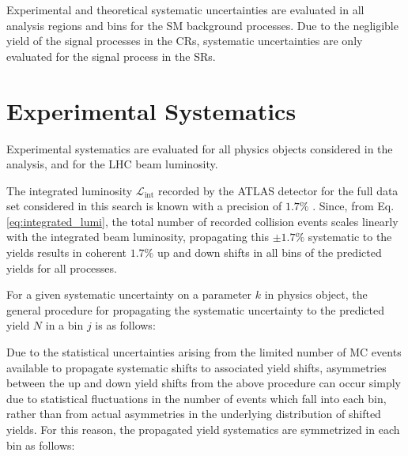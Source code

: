 Experimental and theoretical systematic uncertainties are evaluated in all analysis regions and bins for the SM background processes. Due to the negligible yield of the signal processes in the CRs, systematic uncertainties are only evaluated for the signal process in the SRs.

\section{Experimental Systematics}

Experimental systematics are evaluated for all physics objects considered in the analysis, and for the LHC beam luminosity. 

The integrated luminosity \(\mathcal{L}_\text{int}\) recorded by the ATLAS detector for the full data set considered in this search is known with a precision of \(1.7\%\) \cite{ATLAS-CONF-2019-021}. Since, from Eq. \ref{eq:integrated_lumi}, the total number of recorded collision events scales linearly with the integrated beam luminosity, propagating this \(\pm1.7\%\) systematic to the yields results in coherent \(1.7\%\) up and down shifts in all bins of the predicted yields for all processes.

For a given systematic uncertainty on a parameter \(k\) in physics object, the general procedure for propagating the systematic uncertainty to the predicted yield \(N\) in a bin \(j\) is as follows:


\noindent Due to the statistical uncertainties arising from the limited number of MC events available to propagate systematic shifts to associated yield shifts, asymmetries between the up and down yield shifts from the above procedure can occur simply due to statistical fluctuations in the number of events which fall into each bin, rather than from actual asymmetries in the underlying distribution of shifted yields. For this reason, the propagated yield systematics are symmetrized in each bin as follows:

